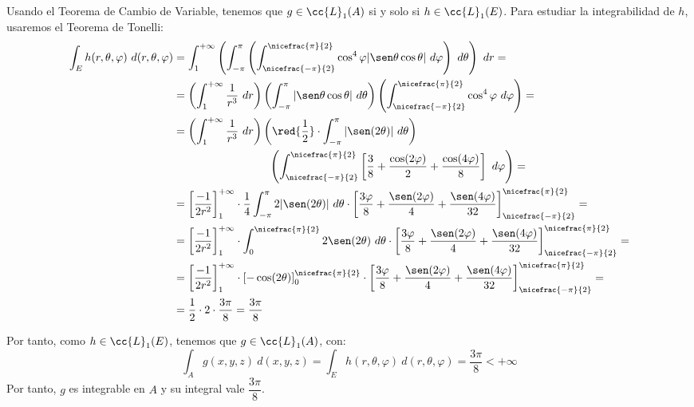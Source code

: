 \begin{ejercicio}
    Usando el Teorema de Cambio de Variable, tenemos que $g\in \cc{L}_1(A)$ si y solo si $h\in \cc{L}_1(E)$. Para estudiar la integrabilidad de $h$, usaremos el Teorema de Tonelli:
    \begin{align*}
        \int_E h(r, \theta, \varphi)~d(r, \theta, \varphi) &=
        \int_1^{+\infty} \left( \int_{-\pi}^{\pi} \left( \int_{\nicefrac{-\pi}{2}}^{\nicefrac{\pi}{2}} \cos^4\varphi|\sen\theta\cos\theta|~d\varphi \right)~d\theta \right)~dr =\\
        &= \left( \int_1^{+\infty} \dfrac{1}{r^3}~dr \right) \left( \int_{-\pi}^{\pi} |\sen\theta\cos\theta|~d\theta \right) \left( \int_{\nicefrac{-\pi}{2}}^{\nicefrac{\pi}{2}} \cos^4\varphi~d\varphi \right) =\\
        &= \left( \int_1^{+\infty} \dfrac{1}{r^3}~dr \right) \left( \red{\dfrac{1}{2}}\cdot \int_{-\pi}^{\pi} |\sen(2\theta)|~d\theta \right)\\&\hspace{3cm}\left( \int_{\nicefrac{-\pi}{2}}^{\nicefrac{\pi}{2}}  \left[\dfrac{3}{8}+\dfrac{\cos(2\varphi)}{2}+\dfrac{\cos(4\varphi)}{8}\right]~d\varphi \right) =\\
        &= \left[\dfrac{-1}{2r^2}\right]_1^{+\infty} \cdot \dfrac{1}{4}\int_{-\pi}^{\pi} 2|\sen(2\theta)|~d\theta \cdot \left[\dfrac{3\varphi}{8}+\dfrac{\sen(2\varphi)}{4}+\dfrac{\sen(4\varphi)}{32}\right]_{\nicefrac{-\pi}{2}}^{\nicefrac{\pi}{2}} =\\
        &= \left[\dfrac{-1}{2r^2}\right]_1^{+\infty} \cdot \int_{0}^{\nicefrac{\pi}{2}} 2\sen(2\theta)~d\theta \cdot \left[\dfrac{3\varphi}{8}+\dfrac{\sen(2\varphi)}{4}+\dfrac{\sen(4\varphi)}{32}\right]_{\nicefrac{-\pi}{2}}^{\nicefrac{\pi}{2}} =\\
        &= \left[\dfrac{-1}{2r^2}\right]_1^{+\infty} \cdot \left[-\cos(2\theta)\right]_0^{\nicefrac{\pi}{2}} \cdot \left[\dfrac{3\varphi}{8}+\dfrac{\sen(2\varphi)}{4}+\dfrac{\sen(4\varphi)}{32}\right]_{\nicefrac{-\pi}{2}}^{\nicefrac{\pi}{2}} =\\
        &= \dfrac{1}{2}\cdot 2 \cdot \dfrac{3\pi}{8} = \dfrac{3\pi}{8}
    \end{align*}

    Por tanto, como $h\in \cc{L}_1(E)$, tenemos que $g\in \cc{L}_1(A)$, con:
    \begin{equation*}
        \int_{A} g(x, y, z)~d(x, y, z) = \int_{E} h(r, \theta, \varphi)~d(r, \theta, \varphi) = \dfrac{3\pi}{8} < +\infty
    \end{equation*}
    Por tanto, $g$ es integrable en $A$ y su integral vale $\dfrac{3\pi}{8}$.
\end{ejercicio}